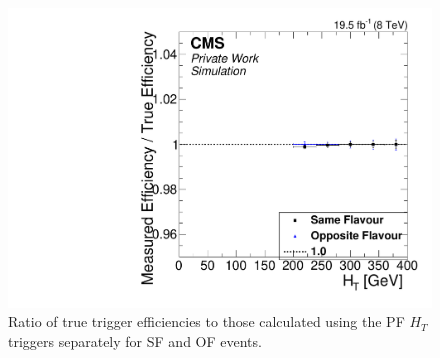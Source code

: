 \begin{figure}
\begin{center}
\includegraphics[scale=0.35]{plots/BG/trigger/Triggereff_AlphaTSyst_PFHT_HighHTExclusive_Full2012_HT_None.pdf}
\caption{Ratio of true trigger efficiencies to those calculated using the PF $H_T$ triggers separately for SF and OF events.}
\label{fig:triggerEffBias}
\end{center}
\end{figure}
